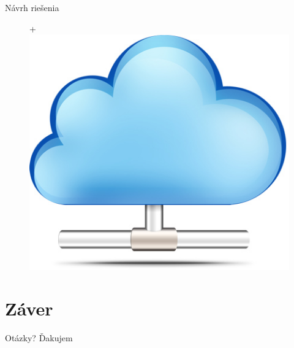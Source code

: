 \documentclass[hyperref={unicode}]{beamer}
\begin{document}
\begin{frame}{Návrh riešenia}
\begin{figure}[htp]
		{\Huge +}
		\includegraphics[align=c,height=\myGraphicsHeight]{cloud-computing}
	\end{figure}
\end{frame}



\section{Záver}

\begin{frame}{Otázky?}
	\centering
	{\Large Ďakujem}
\end{frame}
\end{document}
